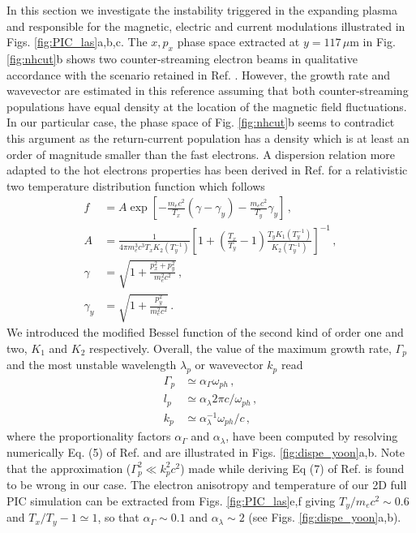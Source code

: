 \documentclass[aps,showpacs,superscriptaddress]{revtex4}
\begin{document}
In this section we investigate the instability triggered in the expanding plasma and responsible for the magnetic, electric  and current modulations illustrated in Figs. \ref{fig:PIC_las}a,b,c. 
The $x,p_x$ phase space extracted at $y=117\, \mu$m in Fig. \ref{fig:nhcut}b shows two counter-streaming electron beams in qualitative accordance with the scenario retained in Ref. \cite[]{PRL_Gode_2017}. 
However, the growth rate and wavevector are estimated in this reference assuming that both counter-streaming populations have equal density at the location of the magnetic field fluctuations. 
In our particular case, the phase space of Fig. \ref{fig:nhcut}b seems to contradict this argument   as the return-current population has a density which is at least an order of magnitude smaller than the fast electrons.
A dispersion  relation  more adapted to the hot electrons properties has been derived in Ref. \cite[]{POP_Yoon_2007b} for a relativistic two temperature distribution function which follows 
\begin{align}
    f &= A \exp\left[ -\frac{m_ec^2}{T_x}(\gamma -\gamma_y) -\frac{m_ec^2}{T_y}\gamma_y \right]\, , \\
    A &= \frac{1}{4\pi m_e^3c^3T_xK_2(T_y^{-1}) } \left[1+\left(\frac{T_x}{T_y}-1\right)\frac{T_yK_1(T_y^{-1})}{K_2(T_y^{-1})}  \right]^{-1}\, ,\\
    \gamma &= \sqrt{ 1 + \frac{p_x^2 +p_y^2}{m_e^2c^2}} \, , \\
    \gamma_y &=  \sqrt{ 1 + \frac{p_y^2}{m_e^2c^2}} \, .
\end{align}
We introduced the modified Bessel function of the second kind of order one and two, $K_1$ and $K_2$ respectively.
Overall, the value of the maximum growth rate,  $\Gamma_p$ and the most unstable wavelength $\lambda_p$ or wavevector $k_p$ read
\begin{align}
   \Gamma_p &\simeq \alpha_\Gamma \omega_{ph}  \label{eq:gp} \, , \\ 
   l_p &\simeq \alpha_\lambda 2\pi c/\omega_{ph} \label{eq:lp}  \, , \\
      k_p &\simeq \alpha_\lambda^{-1} \omega_{ph}/c\label{eq:kp}  \, ,
\end{align}
where the  proportionality factors $\alpha_\Gamma$ and $\alpha_\lambda$, have been computed by resolving numerically Eq. (5) of Ref. \cite[]{POP_Yoon_2007b} and are illustrated in Figs. \ref{fig:dispe_yoon}a,b.
Note that the approximation  ($\Gamma_p^2 \ll k_p^2 c^2$) made while deriving Eq (7) of Ref. \cite[]{POP_Yoon_2007b} is found to be wrong in our case.
The electron anisotropy and temperature of our 2D full PIC simulation can be extracted from  Figs. \ref{fig:PIC_las}e,f giving   $T_y/m_ec^2 \sim 0.6$ and $ T_x/T_y -1\simeq 1 $, so that  $\alpha_\Gamma \sim 0.1$ and $\alpha_\lambda \sim 2$ (see Figs. \ref{fig:dispe_yoon}a,b).
\end{document}
